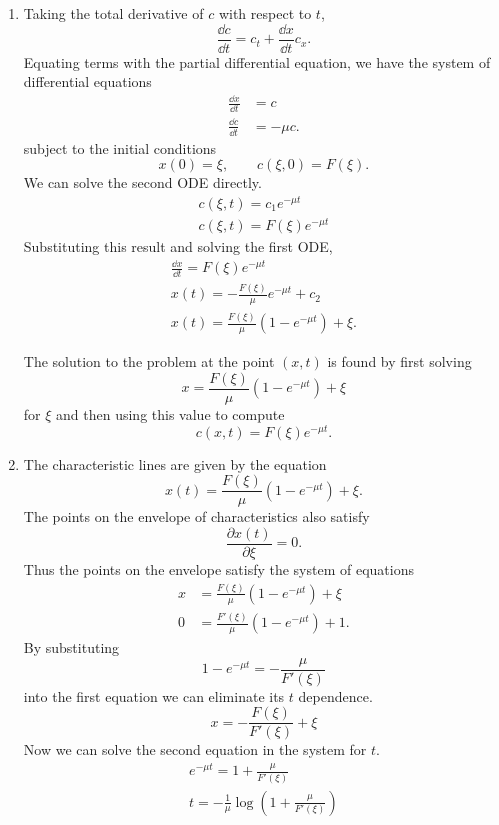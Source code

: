 \begin{Solution}
  \begin{enumerate}
  \item
    Taking the total derivative of $c$ with respect to $t$,
    \[ \frac{\dd c}{\dd t} = c_t + \frac{\dd x}{\dd t} c_x. \]
    Equating terms with the partial differential equation,
    we have the system of differential equations
    \begin{align*}
      \frac{\dd x}{\dd t} &= c \\
      \frac{\dd c}{\dd t} &= -\mu c.
    \end{align*}
    subject to the initial conditions
    \[ x(0) = \xi, \qquad c(\xi,0) = F(\xi). \]
    We can solve the second ODE directly.
    \begin{gather*}
      c(\xi,t) = c_1 e^{-\mu t} \\
      c(\xi,t) = F(\xi) e^{-\mu t}
    \end{gather*}
    Substituting this result and solving the first ODE,
    \begin{gather*}
      \frac{\dd x}{\dd t} = F(\xi) e^{-\mu t} \\
      x(t) = - \frac{F(\xi)}{\mu} e^{-\mu t} + c_2 \\
      x(t) = \frac{F(\xi)}{\mu}(1-e^{-\mu t}) + \xi.
    \end{gather*}

    The solution to the problem at the point $(x,t)$ is found by first solving
    \[ x = \frac{F(\xi)}{\mu}(1-e^{-\mu t}) + \xi \]
    for $\xi$ and then using this value to compute
    \[ c(x,t) = F(\xi) e^{-\mu t}. \]
  \item
    The characteristic lines are given by the equation
    \[ x(t) = \frac{F(\xi)}{\mu}(1-e^{-\mu t}) + \xi. \]
    The points on the envelope of characteristics also satisfy 
    \[ \frac{\partial x(t)}{\partial \xi} = 0. \]
    Thus the points on the envelope satisfy the system of equations
    \begin{align*}
      x &= \frac{F(\xi)}{\mu}(1-e^{-\mu t}) + \xi \\
      0 &= \frac{F'(\xi)}{\mu}(1-e^{-\mu t}) + 1.
    \end{align*}
    By substituting
    \[ 1-e^{-\mu t} = -\frac{\mu}{F'(\xi)} \]
    into the first equation we can eliminate its $t$ dependence.
    \[ x = -\frac{F(\xi)}{F'(\xi)} + \xi \]
    Now we can solve the second equation in the system for $t$.
    \begin{gather*}
      e^{-\mu t} = 1 + \frac{\mu}{F'(\xi)} \\
      t = -\frac{1}{\mu} \log\left(1 + \frac{\mu}{F'(\xi)} \right)
    \end{gather*}


\end{enumerate}
\end{Solution}
